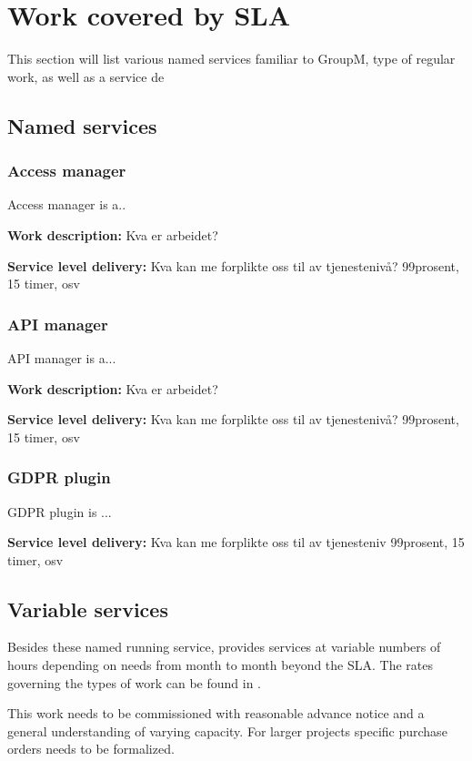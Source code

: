\section{Work covered by SLA}
This section will list various named services familiar to GroupM, type of regular work, as well as a service de


\subsection{Named services}


\subsubsection{Access manager}
Access manager is a..

\textbf{Work description:} Kva er arbeidet?

\textbf{Service level delivery:} Kva kan me forplikte oss til av tjenestenivå? 99prosent, 15 timer, osv



\subsubsection{API manager}
API manager is a...

\textbf{Work description:} Kva er arbeidet?

\textbf{Service level delivery:} Kva kan me forplikte oss til av tjenestenivå? 99prosent, 15 timer, osv

\subsubsection{GDPR plugin}
GDPR plugin is ...

\textbf{Service level delivery:} Kva kan me forplikte oss til av tjenesteniv 99prosent, 15 timer, osv

\subsection{Variable services}
Besides these named running service, \suppliername provides services at variable numbers of hours depending on \customername needs from month to month beyond the SLA. The rates governing the types of work can be found in .

This work needs to be commissioned with reasonable advance notice and a general understanding of varying capacity. For larger projects specific purchase orders needs to be formalized.

